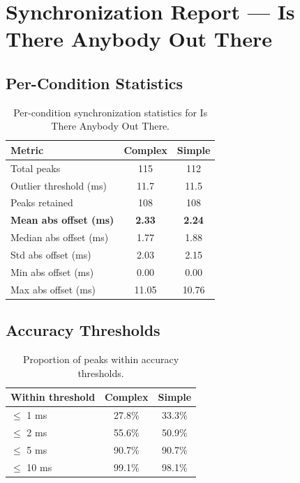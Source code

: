 
\section*{Synchronization Report --- Is There Anybody Out There}

\subsection*{Per-Condition Statistics}

\begin{table}[h!]
\centering
\begin{tabular}{|l|c|c|}
\hline
Metric & Complex & Simple \\
\hline
Total peaks & 115 & 112 \\
Outlier threshold (ms) & 11.7 & 11.5 \\
Peaks retained & 108 & 108 \\
\textbf{Mean abs offset (ms)} & \textbf{2.33} & \textbf{2.24} \\
Median abs offset (ms) & 1.77 & 1.88 \\
Std abs offset (ms) & 2.03 & 2.15 \\
Min abs offset (ms) & 0.00 & 0.00 \\
Max abs offset (ms) & 11.05 & 10.76 \\
\hline
\end{tabular}
\caption{Per-condition synchronization statistics for Is There Anybody Out There.}
\label{tab:sync_stats}
\end{table}

\subsection*{Accuracy Thresholds}

\begin{table}[h!]
\centering
\begin{tabular}{|l|c|c|}
\hline
Within threshold & Complex & Simple \\
\hline
$\leq$ 1 ms & 27.8\% & 33.3\% \\
$\leq$ 2 ms & 55.6\% & 50.9\% \\
$\leq$ 5 ms & 90.7\% & 90.7\% \\
$\leq$ 10 ms & 99.1\% & 98.1\% \\
\hline
\end{tabular}
\caption{Proportion of peaks within accuracy thresholds.}
\label{tab:sync_accuracy}
\end{table}

